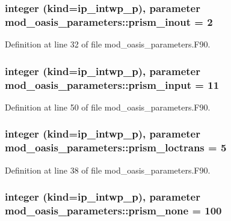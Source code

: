 \hypertarget{classmod__oasis__parameters_ae8105d0074bcd93e7da5c40331d2b9fe}{
\subsubsection[{prism\+\_\+inout}]{\setlength{\rightskip}{0pt plus 5cm}integer (kind=ip\+\_\+intwp\+\_\+p), parameter mod\+\_\+oasis\+\_\+parameters\+::prism\+\_\+inout = 2}}\label{classmod__oasis__parameters_ae8105d0074bcd93e7da5c40331d2b9fe}


Definition at line 32 of file mod\+\_\+oasis\+\_\+parameters.\+F90.

\hypertarget{classmod__oasis__parameters_aa9009f13473f2cb6476c2fb5e4963243}{
\subsubsection[{prism\+\_\+input}]{\setlength{\rightskip}{0pt plus 5cm}integer (kind=ip\+\_\+intwp\+\_\+p), parameter mod\+\_\+oasis\+\_\+parameters\+::prism\+\_\+input = 11}}\label{classmod__oasis__parameters_aa9009f13473f2cb6476c2fb5e4963243}


Definition at line 50 of file mod\+\_\+oasis\+\_\+parameters.\+F90.

\hypertarget{classmod__oasis__parameters_af9dc530c2cf2f0e5b5bb04fecb8373dd}{
\subsubsection[{prism\+\_\+loctrans}]{\setlength{\rightskip}{0pt plus 5cm}integer (kind=ip\+\_\+intwp\+\_\+p), parameter mod\+\_\+oasis\+\_\+parameters\+::prism\+\_\+loctrans = 5}}\label{classmod__oasis__parameters_af9dc530c2cf2f0e5b5bb04fecb8373dd}


Definition at line 38 of file mod\+\_\+oasis\+\_\+parameters.\+F90.

\hypertarget{classmod__oasis__parameters_a81e4e20be511cd8be2ab3881b42f8f3e}{
\subsubsection[{prism\+\_\+none}]{\setlength{\rightskip}{0pt plus 5cm}integer (kind=ip\+\_\+intwp\+\_\+p), parameter mod\+\_\+oasis\+\_\+parameters\+::prism\+\_\+none = 100}}\label{classmod__oasis__parameters_a81e4e20be511cd8be2ab3881b42f8f3e}


